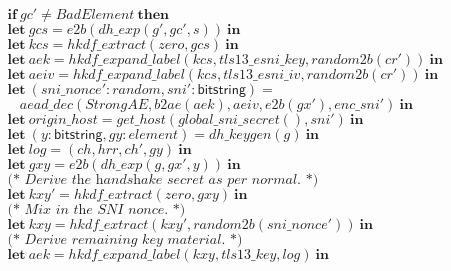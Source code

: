 \documentclass{article}
\newcommand{\kwl}[1]{\mathbf{#1}}
\newcommand{\kwt}[1]{\mathsf{#1}}
\newcommand{\var}[1]{\mathit{#1}}
\theoremstyle{definition}
\begin{document}
\begin{tabbing}
$\ \ \ \ \ \kwl{if}\ \var{gc'}\neq\var{BadElement}\ \kwl{then} $\\
$\ \ \ \ \ \kwl{let}\ \var{gcs} = \var{e2b}(\var{dh{\_}exp}(\var{g'}, \var{gc'}, \var{s}))\ \kwl{in} $\\
$\ \ \ \ \ \kwl{let}\ \var{kcs} = \var{hkdf{\_}extract}(\var{zero}, \var{gcs})\ \kwl{in} $\\
$\ \ \ \ \ \kwl{let}\ \var{aek} = \var{hkdf{\_}expand{\_}label}(\var{kcs}, \var{tls13{\_}esni{\_}key}, \var{random2b}(\var{cr'}))\ \kwl{in} $\\
$\ \ \ \ \ \kwl{let}\ \var{aeiv} = \var{hkdf{\_}expand{\_}label}(\var{kcs}, \var{tls13{\_}esni{\_}iv}, \var{random2b}(\var{cr'}))\ \kwl{in} $\\
$\ \ \ \ \ \kwl{let}\ (\var{sni{\_}nonce'}{:}\var{random}, \var{sni'}{:}\kwt{bitstring}) =  $\\
$\ \ \ \ \ \ \ \ \ \var{aead{\_}dec}(\var{StrongAE}, \var{b2ae}(\var{aek}), \var{aeiv}, \var{e2b}(\var{gx'}), \var{enc{\_}sni'})\ \kwl{in} $\\
$ $\\
$\ \ \ \ \ \kwl{let}\ \var{origin{\_}host} = \var{get{\_}host}(\var{global{\_}sni{\_}secret}(), \var{sni'})\ \kwl{in} $\\
$ $\\
$\ \ \ \ \ \kwl{let}\ (\var{y}{:}\kwt{bitstring}, \var{gy}{:}\var{element}) = \var{dh{\_}keygen}(\var{g})\ \kwl{in} $\\
$\ \ \ \ \ \kwl{let}\ \var{log} = (\var{ch}, \var{hrr}, \var{ch'}, \var{gy})\ \kwl{in} $\\
$\ \ \ \ \ \kwl{let}\ \var{gxy} = \var{e2b}(\var{dh{\_}exp}(\var{g}, \var{gx'}, \var{y}))\ \kwl{in} $\\
$ $\\
$\ \ \ \ \ \textit{(* Derive the handshake secret as per normal. *)} $\\
$\ \ \ \ \ \kwl{let}\ \var{kxy'} = \var{hkdf{\_}extract}(\var{zero}, \var{gxy})\ \kwl{in} $\\
$ $\\
$\ \ \ \ \ \textit{(* Mix in the SNI nonce. *)} $\\
$\ \ \ \ \ \kwl{let}\ \var{kxy} = \var{hkdf{\_}extract}(\var{kxy'}, \var{random2b}(\var{sni{\_}nonce'}))\ \kwl{in} $\\
$ $\\
$\ \ \ \ \ \textit{(* Derive remaining key material. *)} $\\
$\ \ \ \ \ \kwl{let}\ \var{aek} = \var{hkdf{\_}expand{\_}label}(\var{kxy}, \var{tls13{\_}key}, \var{log})\ \kwl{in} $\\

\end{tabbing}
\end{document}
